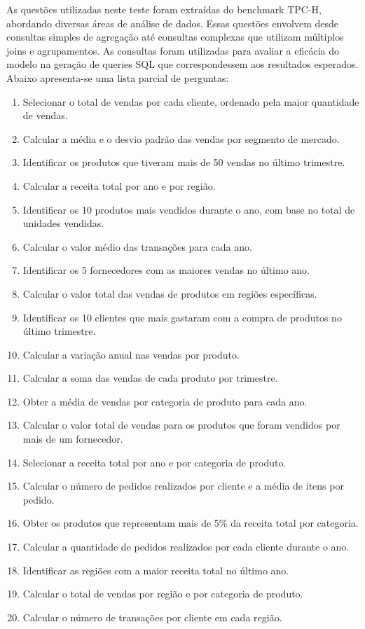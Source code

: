\documentclass{article}
\begin{document}
\hspace*{1em} As questões utilizadas neste teste foram extraídas do benchmark TPC-H, abordando diversas áreas de análise de dados. Essas questões envolvem desde consultas simples de agregação até consultas complexas que utilizam múltiplos joins e agrupamentos. As consultas foram utilizadas para avaliar a eficácia do modelo na geração de queries SQL que correspondessem aos resultados esperados. Abaixo apresenta-se uma lista parcial de perguntas:

\begin{enumerate} 
    \item Selecionar o total de vendas por cada cliente, ordenado pela maior quantidade de vendas. 
    \item Calcular a média e o desvio padrão das vendas por segmento de mercado. 
    \item Identificar os produtos que tiveram mais de 50 vendas no último trimestre. \item Calcular a receita total por ano e por região. 
    \item Identificar os 10 produtos mais vendidos durante o ano, com base no total de unidades vendidas. 
    \item Calcular o valor médio das transações para cada ano. 
    \item Identificar os 5 fornecedores com as maiores vendas no último ano. 
    \item Calcular o valor total das vendas de produtos em regiões específicas. 
    \item Identificar os 10 clientes que mais gastaram com a compra de produtos no último trimestre. 
    \item Calcular a variação anual nas vendas por produto. 
    \item Calcular a soma das vendas de cada produto por trimestre. 
    \item Obter a média de vendas por categoria de produto para cada ano. 
    \item Calcular o valor total de vendas para os produtos que foram vendidos por mais de um fornecedor. 
    \item Selecionar a receita total por ano e por categoria de produto. 
    \item Calcular o número de pedidos realizados por cliente e a média de itens por pedido. 
    \item Obter os produtos que representam mais de 5\% da receita total por categoria. 
    \item Calcular a quantidade de pedidos realizados por cada cliente durante o ano. \item Identificar as regiões com a maior receita total no último ano. 
    \item Calcular o total de vendas por região e por categoria de produto. 
    \item Calcular o número de transações por cliente em cada região. 
\end{enumerate}
\end{document}

